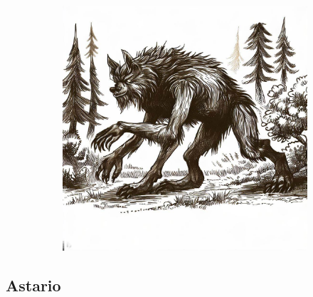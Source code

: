 \documentclass[11pt, twoside]{article}
\begin{document}
\begin{figure}[H]
\begin{subfigure}{0.3\textwidth}
  \end{subfigure}%
  \begin{subfigure}{0.3\textwidth}
    \centering
    \includegraphics[width=0.99\linewidth]{wolf3.jpeg}
  \end{subfigure}
\end{figure}

\newpage

\subsection{Astario}
\label{sec:org3f72b4b}
\end{document}
